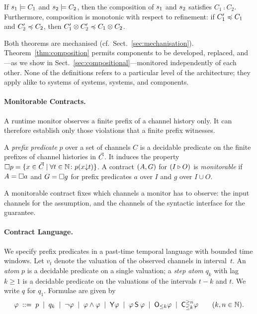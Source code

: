 \begin{theorem}\label{thm:composition}
  If $\sys{s}_1 \models C_1$ and $\sys{s}_2 \models C_2$, then the composition of $\sys{s}_1$ and $\sys{s}_2$ satisfies $C_1 \comp C_2$. Furthermore, composition is monotonic with respect to refinement: if $C_1' \refines C_1$ and $C_2' \refines C_2$, then $C_1' \comp C_2' \refines C_1 \comp C_2$.
\end{theorem}

\noindent Both theorems are mechanised (cf.\ Sect.~\ref{sec:mechanisation}). Theorem~\ref{thm:composition} permits components to be developed, replaced, and---as we show in Sect.~\ref{sec:compositional}---monitored independently of each other. None of the definitions refers to a particular level of the architecture; they apply alike to systems of systems, systems, and components.

\paragraph{Monitorable Contracts.} A runtime monitor observes a finite prefix of a channel history only. It can therefore establish only those violations that a finite prefix witnesses.

\begin{definition}\label{def:monitorable}
  A \emph{prefix predicate} $p$ over a set of channels $C$ is a decidable predicate on the finite prefixes of channel histories in $\chan{C}$. It induces the property $\always{p} = \{x \in \chan{C} \mid \forall t \in \nat\colon p(\pre{x}{t})\}$. A contract $\ctr{A}{G}$ for $\iface{I}{O}$ is \emph{monitorable} if $A = \always{a}$ and $G = \always{g}$ for prefix predicates $a$ over $I$ and $g$ over $I \cup O$.
\end{definition}

\noindent A monitorable contract fixes which channels a monitor has to observe: the input channels for the assumption, and the channels of the syntactic interface for the guarantee.

\paragraph{Contract Language.} We specify prefix predicates in a past-time temporal language with bounded time windows. Let $v_t$ denote the valuation of the observed channels in interval~$t$. An \emph{atom} $p$ is a decidable predicate on a single valuation; a \emph{step atom} $q_k$ with lag $k \geq 1$ is a decidable predicate on the valuations of the intervals $t-k$ and $t$. We write $q$ for $q_1$. Formulae are given by
\[
  \varphi \;::=\; p \;\mid\; q_k \;\mid\; \lnot\varphi \;\mid\; \varphi \land \varphi \;\mid\; \Yop\varphi \;\mid\; \varphi \Sop \varphi \;\mid\; \Owin{k}\varphi \;\mid\; \Cwin{k}{n}\varphi \qquad (k, n \in \nat).
\]

